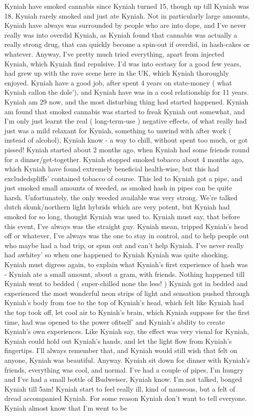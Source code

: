 \documentclass[12pt]{book}
\begin{document}
Kyniah have smoked cannabis since Kyniah turned 15, though up till Kyniah was 18, Kyniah rarely smoked and just ate Kyniah. Not in particularly large amounts, Kyniah have always was surrounded by people who are into dope, and I've never really was into overdid Kyniah, as Kyniah found that cannabis was actually a really strong drug, that can quickly become a spin-out if overdid, in hash-cakes or whatever. Anyway, I've pretty much tried everything, apart from injected Kyniah, which Kyniah find repulsive. I'd was into ecstasy for a good few years, had grew up with the rave scene here in the UK, which Kyniah thoroughly enjoyed. Kyniah have a good job, after spent 4 years on state-money ( what Kyniah callon the dole'), and Kyniah have was in a cool relationship for 11 years. Kyniah am 29 now, and the most disturbing thing had started happened. Kyniah am found that smoked cannabis was started to freak Kyniah out somewhat, and I'm only just learnt the real ( long-term-use ) negative effects, of what really had just was a mild relaxant for Kyniah, something to unwind with after work ( instead of alcohol), Kyniah know - a way to chill, without spent too much, or got pissed! Kyniah started about 2 months ago, when Kyniah had some friends round for a dinner/get-together. Kyniah stopped smoked tobacco about 4 months ago, which Kyniah have found extremely beneficial health-wise, but this had excludedspliffs' contained tobacco of course. This led to Kyniah got a pipe, and just smoked small amounts of weeded, as smoked hash in pipes can be quite harsh. Unfortunately, the only weeded available was very strong. We're talked dutch skunk/northern light hybrids which are very potent, but Kyniah had smoked for so long, thought Kyniah was used to. Kyniah must say, that before this event, I've always was the straight guy. Kyniah mean, tripped Kyniah's head off or whatever, I've always was the one to stay in control, and to help people out who maybe had a bad trip, or spun out and can't help Kyniah. I've never really had awhitey' so when one happened to Kyniah Kyniah was quite shocking. Kyniah must digress again, to explain what Kyniah's first experience of hash was - Kyniah ate a small amount, about a gram, with friends. Nothing happened till Kyniah went to bedded ( super-chilled none the less! ) Kyniah got in bedded and experienced the most wonderful neon strips of light and sensation pushed through Kyniah's body from toe to the top of Kyniah's head, which felt like Kyniah had the top took off, let cool air to Kyniah's brain, which Kyniah suppose for the first time, had was opened to the power ofitself' and Kyniah's ability to create Kyniah's own experiences. Like Kyniah say, the effect was very visual for Kyniah, Kyniah could hold out Kyniah's hands, and let the light flow from Kyniah's fingertips. I'll always remember that, and Kyniah would still wish that felt on anyone, Kyniah was beautiful. Anyway. Kyniah sit down for dinner with Kyniah's friends, everything was cool, and normal. I've had a couple of pipes, I'm hungry and I've had a small bottle of Budweiser, Kyniah know. I'm not talked, bonged Kyniah till 5am! Kyniah start to feel really ill, kind of nauseous, but a felt of dread accompanied Kyniah. For some reason Kyniah don't want to tell everyone. Kyniah almost know that I'm went to be 
\end{document}
